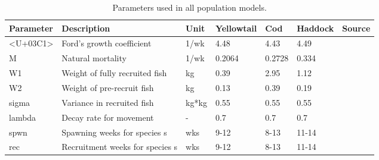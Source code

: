 \documentclass[
  12pt,
]{article}
\begin{document}
\begin{table}
 
 \caption{\label{tab:paramsALL2}Parameters used in all population models.}
 \centering
 \fontsize{10}{12}\selectfont
 \begin{tabular}[t]{lllllll}
 \toprule
 Parameter & Description & Unit & Yellowtail & Cod & Haddock & Source\\
 \midrule
 <U+03C1> & Ford's growth coefficient & 1/wk & 4.48 & 4.43 & 4.49 & \\
 M & Natural mortality & 1/wk & 0.2064 & 0.2728 & 0.334 & \\
 W1 & Weight of fully recruited fish & kg & 0.39 & 2.95 & 1.12 & \\
 W2 & Weight of pre-recruit fish & kg & 0.13 & 0.39 & 0.19 & \\
 sigma & Variance in recruited fish & kg*kg & 0.55 & 0.55 & 0.55 & \\
 \addlinespace
 lambda & Decay rate for movement & - & 0.7 & 0.7 & 0.7 & \\
 spwn & Spawning weeks for species s & wks & 9-12 & 8-13 & 11-14 & \\
 rec & Recruitment weeks for species s & wks & 9-12 & 8-13 & 11-14 & \\
 \bottomrule
 \end{tabular}
 \end{table}
\end{document}
